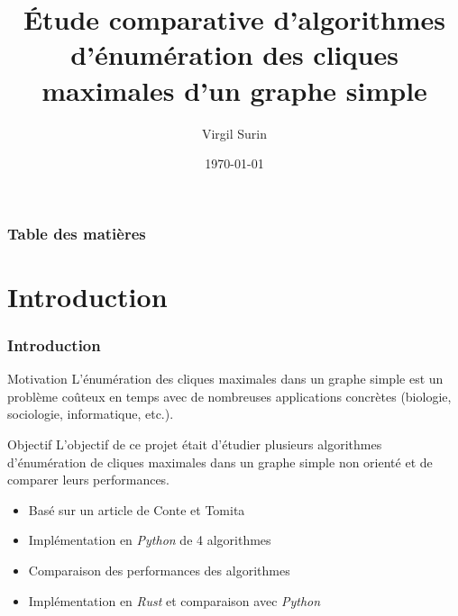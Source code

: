 \documentclass{beamer}
\title[Énumération des cliques maximales]{Étude comparative d'algorithmes d'énumération des cliques maximales d'un graphe simple} %
\author{Virgil Surin} %
\institute[UMONS] %
{
Université de Mons \\ %
\medskip
Directeur: \textit{Hadrien Mélot} %
}
\date{\today} %
\begin{document}
\begin{frame}
\titlepage %
\end{frame}

\begin{frame}
\frametitle{Table des matières} %
\tableofcontents %
\end{frame}


\section{Introduction}
\begin{frame}
\frametitle{Introduction}
\begin{block}{Motivation}
  L'énumération des cliques maximales dans un graphe simple est un problème coûteux en temps avec de nombreuses applications concrètes (biologie, sociologie, informatique, etc.).
\end{block}
\pause
\begin{block}{Objectif}
  L'objectif de ce projet était d'étudier plusieurs algorithmes d'énumération de cliques maximales dans un graphe simple non orienté et de comparer leurs performances.
  \begin{itemize}
    \item Basé sur un article de Conte et Tomita\cite{CONTE20221}
    \item Implémentation en \emph{Python} de 4 algorithmes
    \item Comparaison des performances des algorithmes
    \item Implémentation en \emph{Rust} et comparaison avec \emph{Python}
  \end{itemize}
\end{block}
\end{frame}
\end{document}
